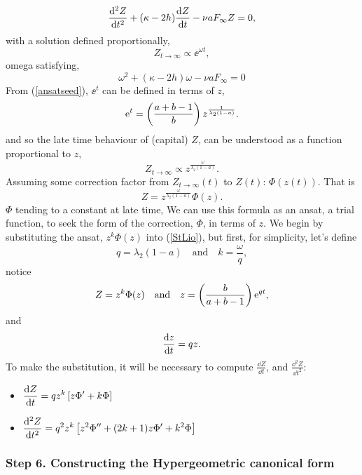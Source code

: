 $$\frac{{\rm d}^2 Z}{{\rm d} t^2} + (\kappa - 2h ) \displaystyle\frac{{\rm d} Z}{{\rm d} t} - \nu a F_\infty Z = 0,$$
with a solution defined proportionally,
$$Z_{t\to\infty} \propto \ee^{\omega t},$$
omega satisfying,
\begin{equation}
\label{passTheAux}
\omega^2 + (\kappa - 2h) \omega - \nu a F_\infty = 0
\end{equation}
From (\ref{ansatseed}), $\ee^t$ can be defined in terms of $z$,
$${\rm e}^t = \left(\frac{a+b-1}{b}\right) z^{\frac{1}{\lambda_2 (1-a)}}.$$
and so the late time behaviour of (capital) $Z$, can be understood as a function proportional to $z$,
$$Z_{t\to\infty}\propto z^{\frac{\omega}{\lambda_2(1-a)}}.$$
Assuming some correction factor from $Z_{t\to\infty}(t)$ to $Z(t)$: $\Phi(z(t))$. That is 
$$Z = z^{\frac{\omega}{\lambda_2(1-a)}} \Phi(z).$$
$\Phi$ tending to a constant at late time, 
We can use this formula as an ansat, a trial function, to seek the form of the correction, $\Phi$, in terms of $z$. We begin by substituting the ansat, $z^k\Phi(z)$ into (\ref{StLio}), but first, for simplicity, let's define 
$$q = \lambda_2(1-a) \quad\text{and}\quad k = \frac{\omega}{q},$$
notice
$$Z = z^{k} \Phi(z) \quad\text{and}\quad  z = \left(\frac{b}{a+b-1}\right) {\rm e}^{qt},$$
and 
$$\displaystyle\frac{{\rm d} z}{{\rm d} t} = q z.$$
To make the substitution, it will be necessary to compute $\frac{\dd Z}{\dd t}$, and $\frac{\dd^2 Z}{\dd t^2}$:
\begin{itemize}
\item $\displaystyle\frac{{\rm d} Z}{{\rm d} t} = q z^k \left[ z\Phi' + k\Phi\right]$
\item $\displaystyle\frac{{\rm d} ^2 Z}{{\rm d} t^2} = q^2 z^k \left[ z^2 \Phi'' + (2k+1)z\Phi' + k^2\Phi\right]$
\end{itemize}

\subsubsection{Step 6. Constructing the Hypergeometric canonical form}

